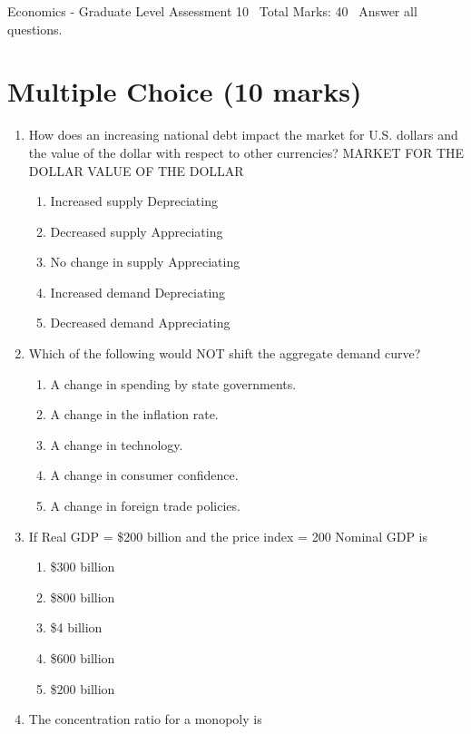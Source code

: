 \documentclass[12pt]{article}
\begin{document}
\begin{center}
Economics - Graduate Level Assessment 10 \
Total Marks: 40 \
Answer all questions.
\end{center}

\section*{Multiple Choice (10 marks)}
\begin{enumerate}[label=\arabic*.]
\item How does an increasing national debt impact the market for U.S. dollars and the value of the dollar with respect to other currencies? MARKET FOR THE DOLLAR VALUE OF THE DOLLAR
\begin{enumerate}[label=(\alph*)]
    \item Increased supply Depreciating
    \item Decreased supply Appreciating
    \item No change in supply Appreciating
    \item Increased demand Depreciating
    \item Decreased demand Appreciating
\end{enumerate}
\item Which of the following would NOT shift the aggregate demand curve?
\begin{enumerate}[label=(\alph*)]
    \item A change in spending by state governments.
    \item A change in the inflation rate.
    \item A change in technology.
    \item A change in consumer confidence.
    \item A change in foreign trade policies.
\end{enumerate}
\item If Real GDP = \$200 billion and the price index = 200 Nominal GDP is
\begin{enumerate}[label=(\alph*)]
    \item \$300 billion
    \item \$800 billion
    \item \$4 billion
    \item \$600 billion
    \item \$200 billion
\end{enumerate}
\item The concentration ratio for a monopoly is
\begin{enumerate}[label=(\alph*)]

\end{enumerate}
\end{enumerate}
\end{document}
